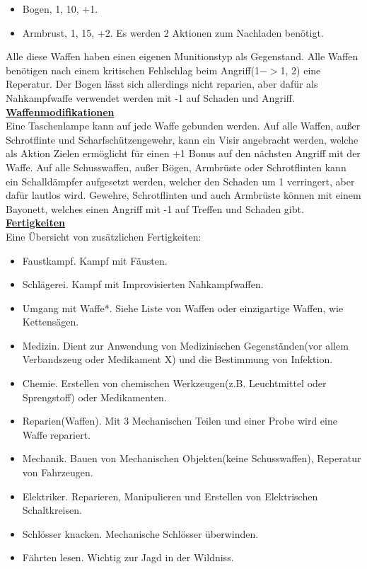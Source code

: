 \documentclass[twoside,a4paper]{minimal}
\begin{document}
\begin{multicols*}{3}
\begin{itemize}
\item Bogen, 1, 10, +1.
\item Armbrust, 1, 15, +2. Es werden 2 Aktionen zum Nachladen benötigt.
\end{itemize}
Alle diese Waffen haben einen eigenen Munitionstyp als Gegenstand. Alle Waffen benötigen nach einem kritischen Fehlschlag beim Angriff(1$->$1, 2) eine Reperatur. Der Bogen lässt sich allerdings nicht reparien, aber dafür als Nahkampfwaffe verwendet werden mit -1 auf Schaden und Angriff.
\textbf{\uline{\\Waffenmodifikationen}}
\\Eine Taschenlampe kann auf jede Waffe gebunden werden. Auf alle Waffen, außer Schrotflinte und Scharfschützengewehr, kann ein Visir angebracht werden, welche als Aktion Zielen ermöglicht für einen +1 Bonus auf den nächsten Angriff mit der Waffe. Auf alle Schusswaffen, außer Bögen, Armbrüste oder Schrotflinten kann ein Schalldämpfer aufgesetzt werden, welcher den Schaden um 1 verringert, aber dafür lautlos wird. Gewehre, Schrotflinten und auch Armbrüste können mit einem Bayonett, welches einen Angriff mit -1 auf Treffen und Schaden gibt.
\textbf{\uline{\\Fertigkeiten}}
\\Eine Übersicht von zusätzlichen Fertigkeiten:
\begin{itemize}
\item Faustkampf. Kampf mit Fäusten.
\item Schlägerei. Kampf mit Improvisierten Nahkampfwaffen.
\item Umgang mit Waffe*. Siehe Liste von Waffen oder einzigartige Waffen, wie Kettensägen.
\item Medizin. Dient zur Anwendung von Medizinischen Gegenständen(vor allem Verbandszeug oder Medikament X) und die Bestimmung von Infektion.
\item Chemie. Erstellen von chemischen Werkzeugen(z.B. Leuchtmittel oder Sprengstoff) oder Medikamenten.
\item Reparien(Waffen). Mit 3 Mechanischen Teilen und einer Probe wird eine Waffe repariert.
\item Mechanik. Bauen von Mechanischen Objekten(keine Schusswaffen), Reperatur von Fahrzeugen.
\item Elektriker. Reparieren, Manipulieren und Erstellen von Elektrischen Schaltkreisen.
\item Schlösser knacken. Mechanische Schlösser überwinden.
\item Fährten lesen. Wichtig zur Jagd in der Wildniss.

\end{itemize}
\end{multicols*}
\end{document}
